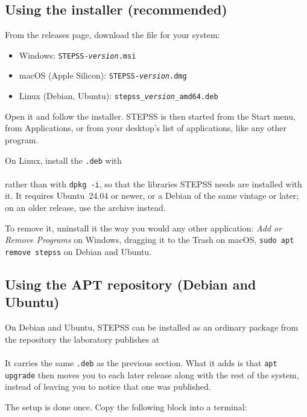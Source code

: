 \subsection{Using the installer (recommended)}

From the releases page, download the file for your system:
\begin{itemize}
\item Windows: {\tt STEPSS-\emph{version}.msi}
\item macOS (Apple Silicon): {\tt STEPSS-\emph{version}.dmg}
\item Linux (Debian, Ubuntu): {\tt stepss\_\emph{version}\_amd64.deb}
\end{itemize}

Open it and follow the installer. STEPSS is then started from the Start menu, from Applications, or from your desktop's list of applications, like any other program.

On Linux, install the {\tt .deb} with\\
\\
rather than with {\tt dpkg -i}, so that the libraries STEPSS needs are installed with it. It requires Ubuntu~24.04 or newer, or a Debian of the same vintage or later; on an older release, use the archive instead.

To remove it, uninstall it the way you would any other application: {\em Add or Remove Programs} on Windows, dragging it to the Trash on macOS, {\tt sudo apt remove stepss} on Debian and Ubuntu.

\subsection{Using the APT repository (Debian and Ubuntu)}

On Debian and Ubuntu, STEPSS can be installed as an ordinary package from the repository the laboratory publishes at\\
\hspace*{5ex}{\tt https://apt.sps-lab.org}\\
It carries the same {\tt .deb} as the previous section. What it adds is that {\tt apt upgrade} then moves you to each later release along with the rest of the system, instead of leaving you to notice that one was published.

The setup is done once. Copy the following block into a terminal:

